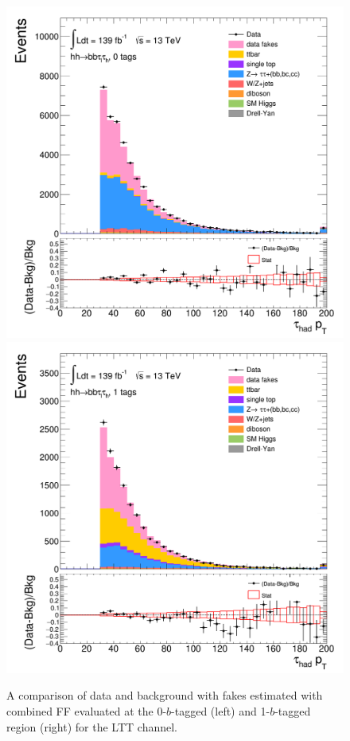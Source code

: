 \begin{figure}[htbp]
\centering
\includegraphics[width=.4\textwidth]{DiHiggs/plots/FF_CRs/SR_LTT_datafakes/HNone/BDTVarsHighMbb/0/C_0tag2pjet_0ptv_TauPt.png}
\includegraphics[width=.4\textwidth]{DiHiggs/plots/FF_CRs/SR_LTT_datafakes/HNone/BDTVarsHighMbb/1/C_1tag2pjet_0ptv_TauPt.png} \\
\caption{A comparison of data and background with fakes estimated with combined FF evaluated at the 0-$b$-tagged (left) 
and 1-$b$-tagged region (right) for the LTT channel. }
\label{fig:FFVRLTT}
\end{figure}










